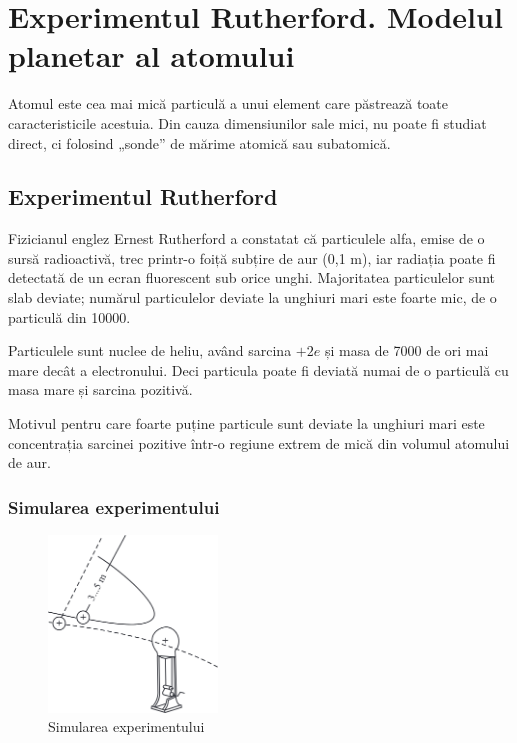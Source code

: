 \section{Experimentul Rutherford. Modelul planetar al atomului}

Atomul este cea mai mică particulă a unui element care păstrează toate
caracteristicile acestuia. Din cauza dimensiunilor sale mici, nu poate fi
studiat direct, ci folosind „sonde” de mărime atomică sau subatomică.

\subsection{Experimentul Rutherford}

Fizicianul englez Ernest Rutherford a constatat că particulele alfa, emise de o
sursă radioactivă, trec printr-o foiță subțire de aur (0,1 {\textmu}m), iar
radiația {\alpha} poate fi detectată de un ecran fluorescent sub orice unghi.
Majoritatea particulelor {\alpha} sunt slab deviate; numărul particulelor deviate la
unghiuri mari este foarte mic, de o particulă din 10000.

Particulele {\alpha} sunt nuclee de heliu, având sarcina $+2e$ și masa de 7000
de ori mai mare decât a electronului. Deci particula {\alpha} poate fi deviată
numai de o particulă cu masa mare și sarcina pozitivă.

Motivul pentru care foarte puține particule sunt deviate la unghiuri mari este
concentrația sarcinei pozitive într-o regiune extrem de mică din volumul
atomului de aur.

\clearpage

\subsubsection*{Simularea experimentului}

\begin{figure}
    \centering
    \includegraphics[width=0.4\textwidth]{fig/rutherford}
    \caption{Simularea experimentului}
\end{figure}

